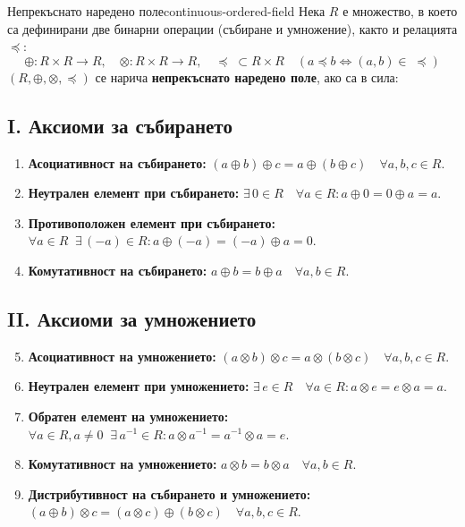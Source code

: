 \begin{definition}{Непрекъснато наредено поле}{continuous-ordered-field}
Нека $R$ е множество, в което са дефинирани две бинарни операции (събиране и умножение), както и релацията $\preccurlyeq$:
\[
\oplus : R \times R \to R, \quad \otimes : R \times R \to R, \quad \preccurlyeq \;\subset R \times R \quad (a \preccurlyeq b \iff (a, b) \in\; \preccurlyeq)
\]
$(R, \oplus, \otimes, \preccurlyeq)$ се нарича \textbf{непрекъснато наредено поле}, ако са в сила:

\subsection*{I. Аксиоми за събирането}
\begin{enumerate}
    \item \textbf{Асоциативност на събирането:} $(a \oplus b) \oplus c = a \oplus (b \oplus c) \quad \forall a, b, c \in R$.
    \item \textbf{Неутрален елемент при събирането:} $\exists\, 0 \in R \quad \forall a \in R : a \oplus 0 = 0 \oplus a = a$.
    \item \textbf{Противоположен елемент при събирането:} $\forall a \in R \;\; \exists\, (-a) \in R : a \oplus (-a) = (-a) \oplus a = 0$.
    \item \textbf{Комутативност на събирането:} $a \oplus b = b \oplus a \quad \forall a, b \in R$.
\end{enumerate}

\subsection*{II. Аксиоми за умножението}
\begin{enumerate}
    \setcounter{enumi}{4}
    \item \textbf{Асоциативност на умножението:} $(a \otimes b) \otimes c = a \otimes (b \otimes c) \quad \forall a, b, c \in R$.
    \item \textbf{Неутрален елемент при умножението:} $\exists\, e \in R \quad \forall a \in R : a \otimes e = e \otimes a = a$.
    \item \textbf{Обратен елемент на умножението:} $\forall a \in R, a \neq 0 \;\; \exists\, a^{-1} \in R : a \otimes a^{-1} = a^{-1} \otimes a = e$.
    \item \textbf{Комутативност на умножението:} $a \otimes b = b \otimes a \quad \forall a, b \in R$.
    \item \textbf{Дистрибутивност на събирането и умножението:} \\
    $(a \oplus b) \otimes c = (a \otimes c) \oplus (b \otimes c) \quad \forall a, b, c \in R$.
\end{enumerate}


\end{definition}
